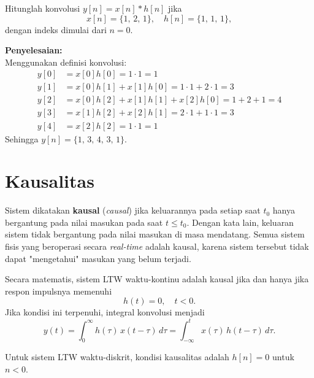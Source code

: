 \begin{exmp}
Hitunglah konvolusi $y[n] = x[n] * h[n]$ jika
\[
x[n] = \{1,\, 2,\, 1\}, \quad h[n] = \{1,\, 1,\, 1\},
\]
dengan indeks dimulai dari $n = 0$.

\textbf{Penyelesaian:}\\
Menggunakan definisi konvolusi:
\begin{align*}
y[0] &= x[0]h[0] = 1 \cdot 1 = 1\\
y[1] &= x[0]h[1] + x[1]h[0] = 1\cdot 1 + 2\cdot 1 = 3\\
y[2] &= x[0]h[2] + x[1]h[1] + x[2]h[0] = 1 + 2 + 1 = 4\\
y[3] &= x[1]h[2] + x[2]h[1] = 2\cdot 1 + 1\cdot 1 = 3\\
y[4] &= x[2]h[2] = 1\cdot 1 = 1
\end{align*}
Sehingga $y[n] = \{1,\, 3,\, 4,\, 3,\, 1\}$.
\end{exmp}

\section{Kausalitas}

Sistem dikatakan \textbf{kausal} (\textit{causal}) jika keluarannya pada setiap saat $t_0$ hanya bergantung pada nilai masukan pada saat $t \le t_0$. Dengan kata lain, keluaran sistem tidak bergantung pada nilai masukan di masa mendatang. Semua sistem fisis yang beroperasi secara \textit{real-time} adalah kausal, karena sistem tersebut tidak dapat "mengetahui" masukan yang belum terjadi.

Secara matematis, sistem LTW waktu-kontinu adalah kausal jika dan hanya jika respon impulsnya memenuhi
\begin{equation}
h(t) = 0, \quad t < 0.
\end{equation}
Jika kondisi ini terpenuhi, integral konvolusi menjadi
\begin{equation}
y(t) = \int_{0}^{\infty} h(\tau)\,x(t-\tau)\,d\tau = \int_{-\infty}^{t} x(\tau)\,h(t-\tau)\,d\tau.
\end{equation}

Untuk sistem LTW waktu-diskrit, kondisi kausalitas adalah $h[n] = 0$ untuk $n < 0$.

